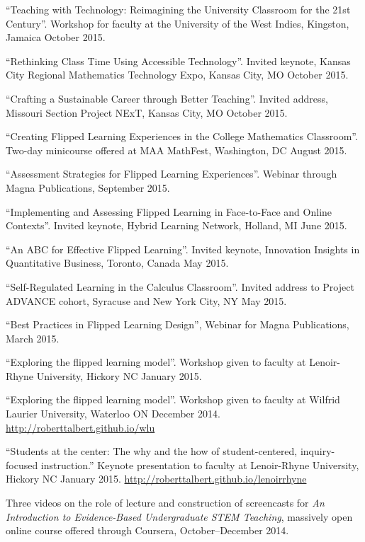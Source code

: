 \documentclass[letterpaper]{article}
\renewenvironment{itemize}{
  \begin{list}{}{
    \setlength{\leftmargin}{1.5em}
	\setlength{\itemsep}{0in}
  }
}{
  \end{list}
}
\begin{document}
\begin{itemize}
	\item ``Teaching with Technology: Reimagining the University Classroom for the 21st Century''. Workshop for faculty at the University of the West Indies, Kingston, Jamaica October 2015. 
	\item ``Rethinking Class Time Using Accessible Technology''. Invited keynote, Kansas City Regional Mathematics Technology Expo, Kansas City, MO October 2015. 
	\item ``Crafting a Sustainable Career through Better Teaching''. Invited address, Missouri Section Project NExT, Kansas City, MO October 2015. 
	\item ``Creating Flipped Learning Experiences in the College Mathematics Classroom''. Two-day minicourse offered at MAA MathFest, Washington, DC August 2015. 
	\item ``Assessment Strategies for Flipped Learning Experiences''. Webinar through Magna Publications, September 2015.
	\item ``Implementing and Assessing Flipped Learning in Face-to-Face and Online Contexts''. Invited keynote, Hybrid Learning Network, Holland, MI June 2015. 
	\item ``An ABC for Effective Flipped Learning''. Invited keynote, Innovation Insights in Quantitative Business, Toronto, Canada May 2015.  
	\item ``Self-Regulated Learning in the Calculus Classroom''. Invited address to Project ADVANCE cohort, Syracuse and New York City, NY May 2015.
	\item ``Best Practices in Flipped Learning Design'', Webinar for Magna Publications, March 2015.  
	\item ``Exploring the flipped learning model''. Workshop given to faculty at Lenoir-Rhyne University, Hickory NC January 2015. 
	\item ``Exploring the flipped learning model''. Workshop given to faculty at Wilfrid Laurier University, Waterloo ON December 2014. \url{http://roberttalbert.github.io/wlu}
	\item ``Students at the center: The why and the how of student-centered, inquiry-focused instruction.'' Keynote presentation to faculty at Lenoir-Rhyne University, Hickory NC January 2015. \url{http://roberttalbert.github.io/lenoirrhyne}
	\item Three videos on the role of lecture and construction of screencasts for \emph{An Introduction to Evidence-Based Undergraduate STEM Teaching}, massively open online course offered through Coursera, October--December 2014. 

\end{itemize}
\end{document}
